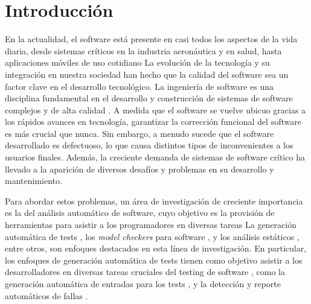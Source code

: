\chapter[Introducción]{Introducción}
\label{cap:introduccion}



En la actualidad, el software está presente en casi todos los aspectos de la vida diaria, desde sistemas críticos en la industria aeronáutica y en salud, hasta aplicaciones móviles de uso cotidiano \cite{Pressman}  La evolución de la tecnología y su integración en nuestra sociedad han hecho que la calidad del software sea un factor clave en el desarrollo tecnológico. La ingeniería de software es una disciplina fundamental en el desarrollo y construcción de sistemas de software complejos y de alta calidad \cite{sommerville2016,pressman2019}. 
A medida que el software se vuelve ubicuo gracias a los rápidos avances en tecnología, garantizar la corrección funcional del software es más crucial que nunca. Sin embargo, a menudo sucede que el software desarrollado es defectuoso, lo que causa distintos tipos de inconvenientes a los usuarios finales.
Además, la creciente demanda de sistemas de software crítico ha llevado a la aparición de diversos desafíos y problemas en su desarrollo y mantenimiento.

Para abordar estos problemas, un área de investigación de creciente importancia es la del análisis automático de software, cuyo objetivo es la provisión de herramientas para asistir a los programadores en diversas tareas
La generación automática de tests \cite{Ponzio:2016, Rosner15, Abad13,
Galeotti:2010, Khalek:2011, Pasareanu:2010, Gligoric10, Tillmann:2008,
Pacheco07}, los \emph{model checkers} para software \cite{Visser06, Visser05,
Clarke:2004}, y los análisis estáticos \cite{Calcagno:2011, Itzhaky:2014}, entre
otros, son enfoques destacados en esta línea de investigación. En particular,
los enfoques de generación automática de tests tienen como objetivo asistir a los desarrolladores 
en diversas tareas cruciales del testing de software \cite{Ammann16,Myers11},
como la generación automática de entradas para los tests \cite{Cadar08,Christakis15,Iosif02,Luckow14,Fraser11}, 
y la detección y reporte automáticos de fallas \cite{Pacheco07, Ma15 , Godefroid05, Marinov01, Boyapati02, Godefroid12}.

